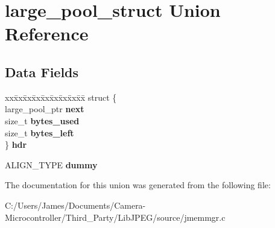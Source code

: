 \hypertarget{unionlarge__pool__struct}{}\section{large\+\_\+pool\+\_\+struct Union Reference}
\label{unionlarge__pool__struct}
\subsection*{Data Fields}
\begin{DoxyCompactItemize}
\item 
\mbox{\label{unionlarge__pool__struct_aa851ef2f78389c4ff076d438fe49696d}} 
\begin{tabbing}
xx\=xx\=xx\=xx\=xx\=xx\=xx\=xx\=xx\=\kill
struct \{\\
\>large\_pool\_ptr {\bfseries next}\\
\>size\_t {\bfseries bytes\_used}\\
\>size\_t {\bfseries bytes\_left}\\
\} {\bfseries hdr}\\

\end{tabbing}\item 
\mbox{\label{unionlarge__pool__struct_a6767eafa48e1d41f5fd99f7f06258dfe}} 
A\+L\+I\+G\+N\+\_\+\+T\+Y\+PE {\bfseries dummy}
\end{DoxyCompactItemize}


The documentation for this union was generated from the following file\+:\begin{DoxyCompactItemize}
\item 
C\+:/\+Users/\+James/\+Documents/\+Camera-\/\+Microcontroller/\+Third\+\_\+\+Party/\+Lib\+J\+P\+E\+G/source/jmemmgr.\+c\end{DoxyCompactItemize}
